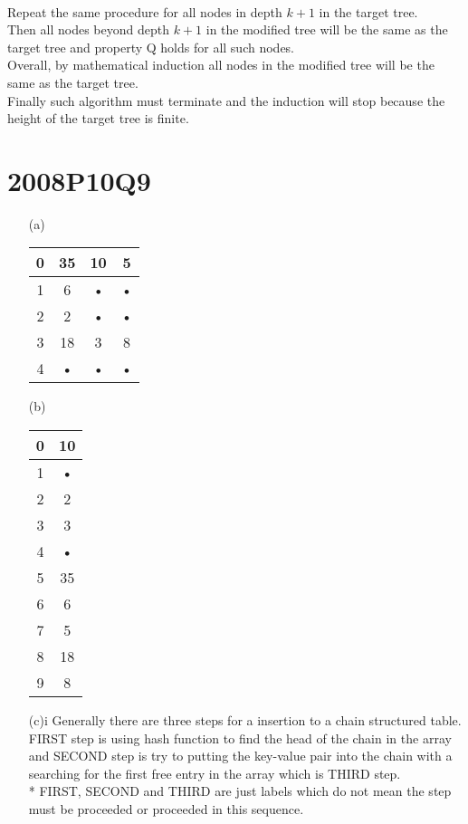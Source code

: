 \documentclass[10pt,twoside,a4paper]{article}
\begin{document}
\begin{itemize}
\\Repeat the same procedure for all nodes in depth $k+1$ in the target tree.
\\Then all nodes beyond depth $k+1$ in the modified tree will be the same as the target tree and property Q holds for all such nodes.
\\Overall, by mathematical induction all nodes in the modified tree will be the same as the target tree.
\\Finally such algorithm must terminate and the induction will stop because the height of the target tree is finite.
\end{itemize}
\section{2008P10Q9}
\begin{itemize}
\item[(a)]
\begin{tabular}{|c|c|c|c|}
\hline 
0 & 35 & 10 & 5 \\ 
\hline 
1 & 6 & • & • \\ 
\hline 
2 & 2 & • & • \\ 
\hline 
3 & 18 & 3 & 8 \\ 
\hline 
4 & • & • & • \\ 
\hline 
\end{tabular} 
\item[(b)]
\begin{tabular}{|c|c|}
\hline 
0 & 10 \\ 
\hline 
1 & • \\ 
\hline 
2 & 2 \\ 
\hline 
3 & 3 \\ 
\hline 
4 & • \\ 
\hline 
5 & 35 \\ 
\hline 
6 & 6 \\ 
\hline 
7 & 5 \\ 
\hline 
8 & 18 \\ 
\hline 
9 & 8 \\ 
\hline 
\end{tabular} 
\item[(c)i]
Generally there are three steps for a insertion to a chain structured table. FIRST step is using hash function to find the head of the chain in the array and SECOND step is try to putting the key-value pair into the chain with a searching for the first free entry in the array which is THIRD step.
\\* FIRST, SECOND and THIRD are just labels which do not mean the step must be proceeded or proceeded in this sequence.

\end{itemize}
\end{document}

